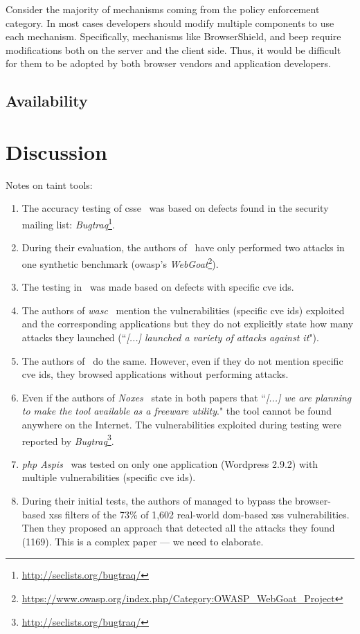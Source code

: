 \documentclass[conference]{IEEEtran}
\begin{document}
Consider the majority of mechanisms coming from
the policy enforcement category. In most cases
developers should modify multiple components
to use each mechanism. Specifically, mechanisms like
BrowserShield, and {\sc beep} require modifications
both on the server and the client side.
Thus, it would be difficult for them to be adopted by
both browser vendors and application developers.

\subsection{Availability}

\section{Discussion}

Notes on taint tools:
\begin{enumerate}
\item The accuracy testing of {\sc csse}~\cite{PB05} was based on 
defects found in the security mailing
list: {\it Bugtraq}\footnote{\url{http://seclists.org/bugtraq/}}.
\item During their evaluation, the authors of~\cite{HCF05} have only performed
two attacks in one synthetic benchmark ({\sc owasp}'s
{\it WebGoat}\footnote{\url{https://www.owasp.org/index.php/Category:OWASP_WebGoat_Project}}).
\item The testing in~\cite{XBS06} was made based on
defects with specific {\sc cve id}s.
\item The authors of {\it {\sc wasc}}~\cite{NLC07}
mention the vulnerabilities (specific {\sc cve id}s)
exploited and the corresponding applications but they do not explicitly
state how many attacks they launched (``{\it [...] launched a variety of
attacks against it}").
\item The authors of~\cite{VFJKKV07} do the same.
However, even if they do not mention specific {\sc cve id}s,
they browsed applications without performing attacks.
\item Even if the authors of {\it Noxes}~\cite{KKVJ06,KJKV09} state in
both papers that ``{\it [...] we are planning to make the tool available as
a freeware utility}." the tool cannot be found anywhere on the Internet.
The vulnerabilities exploited during testing were reported
by {\it Bugtraq}\footnote{\url{http://seclists.org/bugtraq/}}.
\item {\it {\sc php} Aspis}~\cite{PMP11} was tested on only one
application (Wordpress 2.9.2) with multiple vulnerabilities (specific {\sc cve id}s).
\item During their initial tests, the authors of
managed to bypass the browser-based {\sc xss} filters of the
73\% of 1,602 real-world {\sc dom}-based {\sc xss} vulnerabilities.
Then they proposed an approach that detected all the attacks they
found (1169). This is a complex paper --- we need to elaborate.
\end{enumerate}
\end{document}
